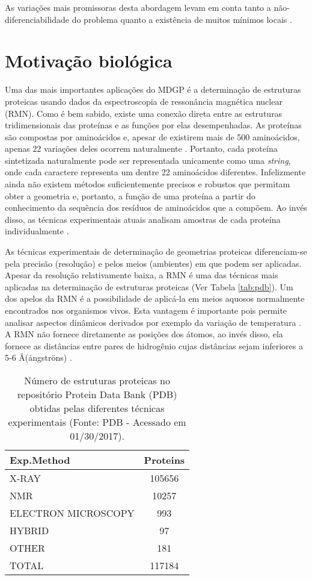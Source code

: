 \documentclass[10pt,a4paper]{article}
\begin{document}
As variações mais promissoras desta abordagem levam em conta tanto a não-diferenciabilidade do problema quanto a existência de muitos mínimos locais \cite{More1999,Souza2011}.

\section{Motivação biológica}\label{sec:bio}
Uma das mais importantes aplicações do MDGP é a determinação de estruturas proteicas usando dados da espectroscopia de ressonância magnética nuclear (RMN). Como é bem sabido, existe uma conexão direta entre as estruturas tridimensionais das proteínas e as funções por elas desempenhadas. As proteínas são compostas por aminoácidos e, apesar de existirem mais de 500 aminoácidos, apenas 22 variações deles ocorrem naturalmente \cite{Atkins2002,Hao2002}. Portanto, cada proteína sintetizada naturalmente pode ser representada unicamente como uma \emph{string}, onde cada caractere representa um dentre 22 aminoácidos diferentes.  Infelizmente ainda não existem métodos suficientemente precisos e robustos que permitam obter a geometria e, portanto, a função de uma proteína a partir do conhecimento da sequência dos resíduos de aminoácidos que a compõem. Ao invés disso, as técnicas experimentais atuais analisam amostras de cada proteína individualmente \cite{Schlick2010}.

As técnicas experimentais de determinação de geometrias proteicas diferen\-ciam-se pela precisão (resolução) e pelos meios (ambientes) em que podem ser aplicadas. Apesar da resolução relativamente baixa, a RMN é uma das técnicas mais aplicadas na determinação de estruturas proteicas (Ver Tabela \eqref{tab:pdb}). Um dos apelos da RMN é a possibilidade de aplicá-la em meios aquosos normalmente encontrados nos organismos vivos. Esta vantagem é importante pois permite analisar aspectos dinâmicos derivados por exemplo da variação de temperatura \cite{Dyson1996}. A RMN não fornece diretamente as posições dos átomos, ao invés disso, ela fornece as distâncias entre pares de hidrogênio cujas distâncias sejam inferiores a 5-6 \AA (\aa ngstr\"{o}ns) \cite{Schlick2010}.

\begin{table}[ht!]
	\centering
	\caption{Número de estruturas proteicas no repositório Protein Data Bank (PDB) obtidas pelas diferentes técnicas experimentais (Fonte: PDB - Acessado em 01/30/2017).}\label{tab:pdb}
	\label{my-label}
	\begin{tabular}{|l|c|}
		\hline
		\textbf{Exp.Method} & \textbf{Proteins} \\ \hline
		X-RAY               & 105656            \\ \hline
		NMR                 & 10257             \\ \hline
		ELECTRON MICROSCOPY & 993               \\ \hline
		HYBRID              & 97                \\ \hline
		OTHER               & 181               \\ \hline
		TOTAL               & 117184            \\ \hline
	\end{tabular}
\end{table}
\end{document}
